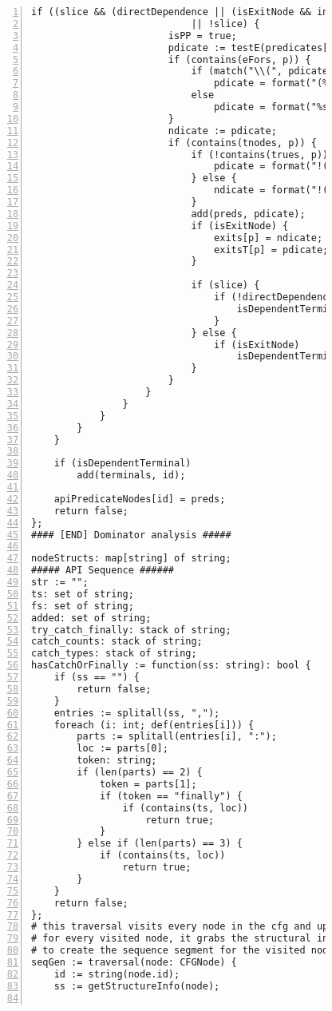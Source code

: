 \begin{figure}[ht!]
\begin{lstlisting}[numbers=left, tabsize=4, escapechar=@, caption={API Usage Mining Analysis},label={lst:aun-code}, lastline = 10]
                    if ((slice && (directDependence || (isExitNode && indirectDependence))) 
                            || !slice) {
                        isPP = true;
                        pdicate := testE(predicates[p]);
                        if (contains(eFors, p)) {
                            if (match("\\(", pdicate)) 
                                pdicate = format("(%s).size() > 0", pdicate);
                            else
                                pdicate = format("%s.size() > 0", pdicate);
                        }
                        ndicate := pdicate;
                        if (contains(tnodes, p)) {
                            if (!contains(trues, p)) {
                                pdicate = format("!(%s)", pdicate);
                            } else {
                                ndicate = format("!(%s)", ndicate);    
                            }
                            add(preds, pdicate);    
                            if (isExitNode) {
                                exits[p] = ndicate;
                                exitsT[p] = pdicate;
                            }

                            if (slice) {
                                if (!directDependence) {
                                    isDependentTerminal = true;
                                }
                            } else {
                                if (isExitNode)
                                    isDependentTerminal = true;	
                            }
                        }
                    } 
                } 
            }
        }
    } 

    if (isDependentTerminal)
        add(terminals, id);
    
    apiPredicateNodes[id] = preds;
    return false;
};
#### [END] Dominator analysis #####

nodeStructs: map[string] of string;
##### API Sequence ######
str := "";
ts: set of string;
fs: set of string;
added: set of string;
try_catch_finally: stack of string;
catch_counts: stack of string;
catch_types: stack of string;
hasCatchOrFinally := function(ss: string): bool {
    if (ss == "") {
        return false;    
    }
    entries := splitall(ss, ",");
    foreach (i: int; def(entries[i])) {
        parts := splitall(entries[i], ":");
        loc := parts[0];
        token: string;
        if (len(parts) == 2) {
            token = parts[1];
            if (token == "finally") {
                if (contains(ts, loc))
                    return true;
            }
        } else if (len(parts) == 3) {
            if (contains(ts, loc))
                return true;
        }
    }
    return false;
};
# this traversal visits every node in the cfg and updates the sequence
# for every visited node, it grabs the structural information, api calls, and preconditions
# to create the sequence segment for the visited node.
seqGen := traversal(node: CFGNode) {
	id := string(node.id);
	ss := getStructureInfo(node);
	

\end{lstlisting}
\end{figure}
